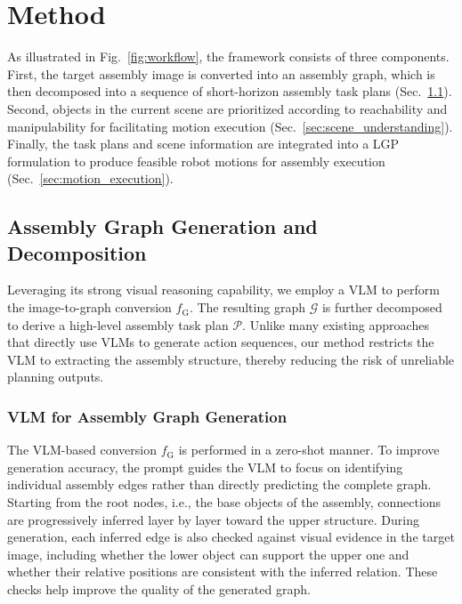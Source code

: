 \documentclass[letterpaper, 10 pt, conference]{ieeeconf}  %
\begin{document}
\section{Method}

As illustrated in Fig.~\ref{fig:workflow}, the framework consists of three components. 
First, the target assembly image is converted into an assembly graph, which is then decomposed into a sequence of short-horizon assembly task plans (Sec.~\ref{sec:task_understanding}). 
Second, objects in the current scene are prioritized according to reachability and manipulability for facilitating motion execution (Sec.~\ref{sec:scene_understanding}). 
Finally, the task plans and scene information are integrated into a LGP formulation to produce feasible robot motions for assembly execution (Sec.~\ref{sec:motion_execution}). 

\subsection{Assembly Graph Generation and Decomposition}
\label{sec:task_understanding}
Leveraging its strong visual reasoning capability, we employ a VLM to perform the image-to-graph conversion $f_{\mathrm{G}}$. 
The resulting graph $\mathcal{G}$ is further decomposed to derive a high-level assembly task plan $\mathcal{P}$. 
Unlike many existing approaches that directly use VLMs to generate action sequences, our method restricts the VLM to extracting the assembly structure, thereby reducing the risk of unreliable planning outputs.

\subsubsection{VLM for Assembly Graph Generation}
The VLM-based conversion $f_{\mathrm{G}}$ is performed in a zero-shot manner. 
To improve generation accuracy, the prompt guides the VLM to focus on identifying individual assembly edges rather than directly predicting the complete graph. 
Starting from the root nodes, i.e., the base objects of the assembly, connections are progressively inferred layer by layer toward the upper structure. 
During generation, each inferred edge is also checked against visual evidence in the target image, including whether the lower object can support the upper one and whether their relative positions are consistent with the inferred relation. 
These checks help improve the quality of the generated graph.
\end{document}
